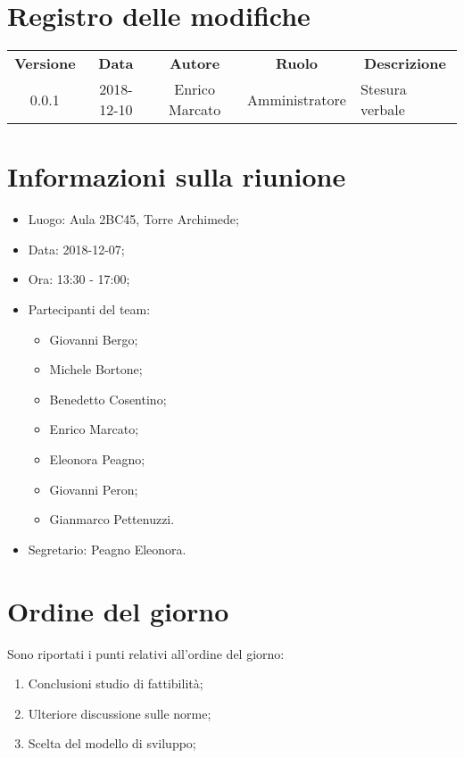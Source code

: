 \documentclass[11pt,a4paper]{article}
\begin{document}
	

	\tableofcontents
	\newpage
	\section*{\centering Registro delle modifiche}
	\begin{tabularx}{\textwidth}{ c | c | c | c | X }
		\rowcolor{LightBlue}
		\color{white}\bfseries Versione & \color{white}\bfseries Data & \color{white}\bfseries Autore & \color{white}\bfseries Ruolo & \multicolumn{1}{c}{\color{white}\bfseries Descrizione}\\[0.25cm]
		0.0.1 & 2018-12-10 & Enrico Marcato & Amministratore & Stesura verbale \\
	\end{tabularx}

	\newpage
	\section{Informazioni sulla riunione}
	\begin{itemize}
	\item Luogo: Aula 2BC45, Torre Archimede;
	\item Data: 2018-12-07;
	\item Ora: 13:30 - 17:00;
	\item Partecipanti del team: 
	\begin{itemize}
		\item Giovanni Bergo;
		\item Michele Bortone;
		\item Benedetto Cosentino;
		\item Enrico Marcato;
		\item Eleonora Peagno;
		\item Giovanni Peron;
		\item Gianmarco Pettenuzzi.
	\end{itemize}
	\item Segretario: Peagno Eleonora.
	\end{itemize}

	\section{Ordine del giorno}
	Sono riportati i punti relativi all'ordine del giorno:
	\begin{enumerate}
	\item Conclusioni studio di fattibilità;
	\item Ulteriore discussione sulle norme;
	\item Scelta del modello di sviluppo; 
	\end{enumerate}
	
\end{document}
